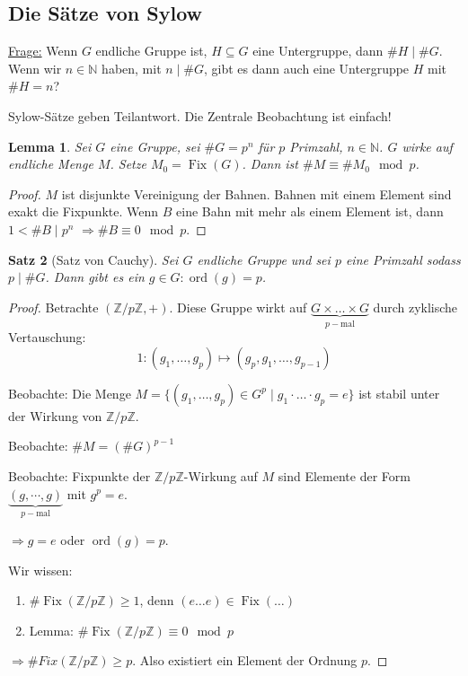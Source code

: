 \documentclass[a4paper,12pt,numbers=noenddot,parskip=full]{scrartcl}
\newcommand{\setN}{\mathbb{N}}
\newcommand{\setZ}{\mathbb{Z}}
\newcommand{\heading}{\underline}
\theoremstyle{dotless}
\newtheorem{theorem}{Satz}[section]
\newtheorem{lemma}[theorem]{Lemma}
\theoremstyle{remark}
\begin{document}
	\subsection{Die Sätze von Sylow}
	
	\heading{Frage:} Wenn $G$ endliche Gruppe ist, $H \subseteq G$ eine Untergruppe, dann $\#H \mid \#G$. Wenn wir $n \in \setN$ haben, mit $n \mid \#G$, gibt es dann auch eine Untergruppe $H$ mit $\# H = n$?
	
	Sylow-Sätze geben Teilantwort. Die Zentrale Beobachtung ist einfach!
	
	\begin{lemma}
		\label{lemma:sylowKeyLemma}
		Sei $G$ eine Gruppe, sei $\#G = p^n$ für $p$ Primzahl, $n \in \setN$. $G$ wirke auf endliche Menge $M$. Setze $M_0 = \operatorname{Fix}(G)$. Dann ist $\# M \equiv \# M_0  \mod p$.
	\end{lemma}

	\begin{proof}
		$M$ ist disjunkte Vereinigung der Bahnen. Bahnen mit einem Element sind exakt die Fixpunkte. Wenn $B$ eine Bahn mit mehr als einem Element ist, dann $1 < \#B \mid p^n$ $\Rightarrow \#B \equiv 0 \mod p$.
	\end{proof}

	\begin{theorem}[Satz von Cauchy]
		Sei $G$ endliche Gruppe und sei $p$ eine Primzahl sodass $p \mid \#G$. Dann gibt es ein $g \in G: \operatorname{ord}(g) = p$.
	\end{theorem}

	\begin{proof}
		Betrachte $(\setZ/p\setZ, +)$. Diese Gruppe wirkt auf $\underbrace{G \times \dots \times G}_{p-\text{mal}}$ durch zyklische Vertauschung:
		\begin{equation*}
			1: (g_1, \dots, g_p) \mapsto (g_p, g_1, \dots, g_{p-1})
		\end{equation*}
		
		Beobachte: Die Menge $M = \{ (g_1, \dots, g_p) \in G^p \mid g_1 \cdot \dots \cdot g_p = e \}$ ist stabil unter der Wirkung von $\setZ/p\setZ$.
		
		Beobachte: $\#M = (\#G)^{p-1}$
		
		Beobachte: Fixpunkte der $\setZ/p\setZ$-Wirkung auf $M$ sind Elemente der Form $\underbrace{(g, \cdots , g)}_{p-\text{mal}}$ mit $g^p = e$.
		
		$\Rightarrow g = e$ oder $\operatorname{ord}(g) = p$.
		
		Wir wissen:
		\begin{enumerate}
			\item $\# \operatorname{Fix}(\setZ / p \setZ) \geq 1$, denn $(e \dots e) \in \operatorname{Fix}(\dots)$
			\item Lemma: $\#\operatorname{Fix}(\setZ / p \setZ) \equiv 0 \mod p$
		\end{enumerate}
	
		$\Rightarrow \#Fix(\setZ / p \setZ) \geq p$. Also existiert ein Element der Ordnung $p$.
	\end{proof}
\end{document}
